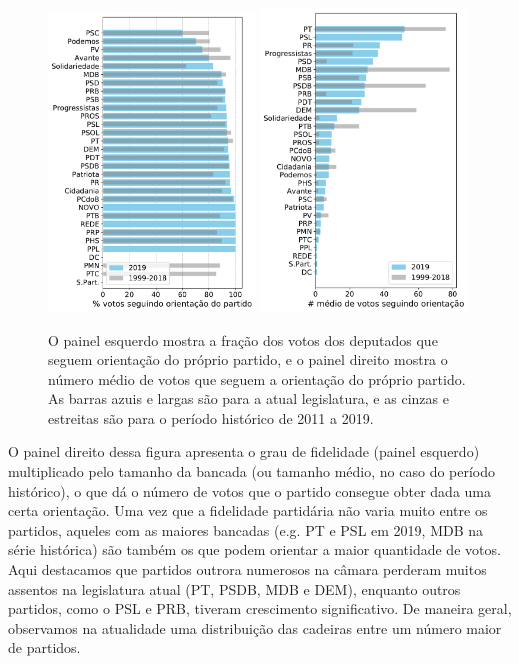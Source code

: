 \documentclass[12pt,a4paper]{article}
\begin{document}
\begin{figure}[H]
\centering
\includegraphics[width=0.49\textwidth]{graficos/fidelidade_partidaria_media_2019-05-03.pdf}
\includegraphics[width=0.49\textwidth]{graficos/poder_partidario_2019-05-03.pdf}
\caption{O painel esquerdo mostra a fração dos votos dos deputados que seguem orientação do próprio partido, e
  o painel direito mostra o número médio de votos que seguem a orientação do próprio partido.
  As barras azuis e largas são para a atual legislatura, e as cinzas e estreitas são para o período
  histórico de 2011 a 2019.
}
\label{fig:fid-poder-partido}
\end{figure} 

O painel direito dessa figura apresenta o grau de fidelidade (painel esquerdo) multiplicado pelo tamanho da bancada
(ou tamanho médio, no caso do período histórico), o que dá o número de votos que o partido consegue
obter dada uma certa orientação. Uma vez que a fidelidade partidária não varia muito entre os partidos,
aqueles com as maiores bancadas (e.g. PT e PSL em 2019, MDB na série histórica) são também os que podem
orientar a maior quantidade de votos. Aqui destacamos que partidos outrora numerosos na câmara perderam
muitos assentos na legislatura atual (PT, PSDB, MDB e DEM), enquanto outros partidos, como o PSL e PRB,
tiveram crescimento significativo. De maneira geral, observamos na atualidade uma distribuição das
cadeiras entre um número maior de partidos.
\end{document}
